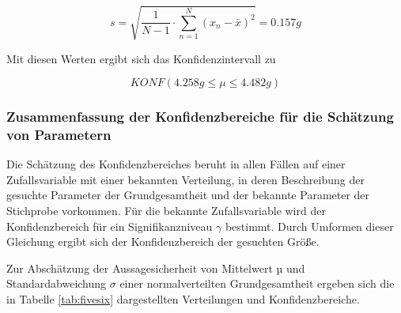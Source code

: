 \begin{equation}\label{eq:fivefiftyeight}
s=\sqrt{\dfrac{1}{N-1} \cdot \sum _{n=1}^{N}\left(x_{n} -\bar{x}\right)^{2}} =0.157 g
\end{equation}

\noindent Mit diesen Werten ergibt sich das Konfidenzintervall zu

\begin{equation}\label{eq:fivefiftynine}
KONF\left(4.258 g\le \mu \le 4.482 g\right)
\end{equation}

\clearpage

\subsubsection{Zusammenfassung der Konfidenzbereiche f\"{u}r die Sch\"{a}tzung von Parametern}

\noindent Die Sch\"{a}tzung des Konfidenzbereiches beruht in allen F\"{a}llen auf einer Zufallsvariable mit einer bekannten Verteilung, in deren Beschreibung der gesuchte Parameter der Grundgesamtheit und der bekannte Parameter der Stichprobe vorkommen. F\"{u}r die bekannte Zufallsvariable wird der Konfidenzbereich f\"{u}r ein Signifikanzniveau $\gamma$ bestimmt. Durch Umformen dieser Gleichung ergibt sich der Konfidenzbereich der gesuchten Gr\"{o}{\ss}e.\newline

\noindent Zur Absch\"{a}tzung der Aussagesicherheit von Mittelwert µ und Standardabweichung $\sigma$ einer normalverteilten Grundgesamtheit ergeben sich die in Tabelle \ref{tab:fivesix} dargestellten Verteilungen und Konfidenzbereiche.

